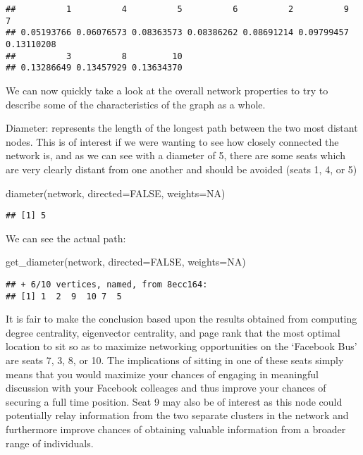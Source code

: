 \documentclass[
]{article}
\newenvironment{Shaded}{\begin{snugshade}}{\end{snugshade}}
\newcommand{\AttributeTok}[1]{\textcolor[rgb]{0.77,0.63,0.00}{#1}}
\newcommand{\ConstantTok}[1]{\textcolor[rgb]{0.00,0.00,0.00}{#1}}
\newcommand{\FunctionTok}[1]{\textcolor[rgb]{0.00,0.00,0.00}{#1}}
\newcommand{\NormalTok}[1]{#1}
\begin{document}
\begin{verbatim}
##          1          4          5          6          2          9          7 
## 0.05193766 0.06076573 0.08363573 0.08386262 0.08691214 0.09799457 0.13110208 
##          3          8         10 
## 0.13286649 0.13457929 0.13634370
\end{verbatim}

We can now quickly take a look at the overall network properties to try
to describe some of the characteristics of the graph as a whole.

Diameter: represents the length of the longest path between the two most
distant nodes. This is of interest if we were wanting to see how closely
connected the network is, and as we can see with a diameter of 5, there
are some seats which are very clearly distant from one another and
should be avoided (seats 1, 4, or 5)

\begin{Shaded}
\begin{Highlighting}[]
\FunctionTok{diameter}\NormalTok{(network, }\AttributeTok{directed=}\ConstantTok{FALSE}\NormalTok{, }\AttributeTok{weights=}\ConstantTok{NA}\NormalTok{)}
\end{Highlighting}
\end{Shaded}

\begin{verbatim}
## [1] 5
\end{verbatim}

We can see the actual path:

\begin{Shaded}
\begin{Highlighting}[]
\FunctionTok{get\_diameter}\NormalTok{(network, }\AttributeTok{directed=}\ConstantTok{FALSE}\NormalTok{, }\AttributeTok{weights=}\ConstantTok{NA}\NormalTok{)}
\end{Highlighting}
\end{Shaded}

\begin{verbatim}
## + 6/10 vertices, named, from 8ecc164:
## [1] 1  2  9  10 7  5
\end{verbatim}

It is fair to make the conclusion based upon the results obtained from
computing degree centrality, eigenvector centrality, and page rank that
the most optimal location to sit so as to maximize networking
opportunities on the `Facebook Bus' are seats 7, 3, 8, or 10. The
implications of sitting in one of these seats simply means that you
would maximize your chances of engaging in meaningful discussion with
your Facebook colleages and thus improve your chances of securing a full
time position. Seat 9 may also be of interest as this node could
potentially relay information from the two separate clusters in the
network and furthermore improve chances of obtaining valuable
information from a broader range of individuals.
\end{document}
